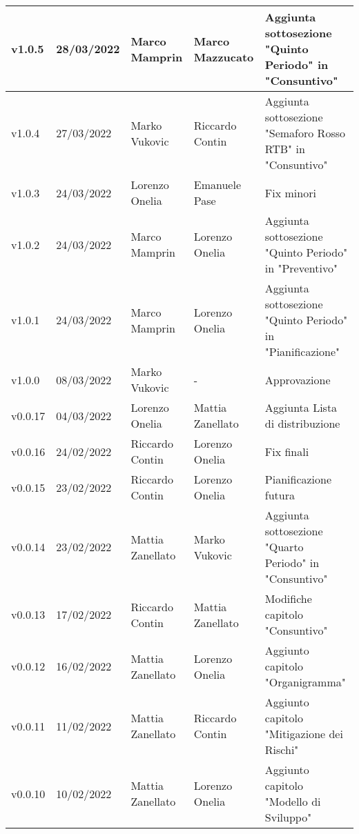 {\begin{longtable}{|C{1.8cm}|C{2.1cm}|C{2cm}|C{2.4cm}|L{4.4cm}|}
  v1.0.5        & 28/03/2022    & Marco Mamprin   &  Marco Mazzucato    & Aggiunta sottosezione "Quinto Periodo" in "Consuntivo" \\ \hline
  v1.0.4        & 27/03/2022    & Marko Vukovic   &  Riccardo Contin    & Aggiunta sottosezione "Semaforo Rosso RTB" in "Consuntivo" \\ \hline
  v1.0.3        & 24/03/2022    & Lorenzo Onelia  & Emanuele Pase    & Fix minori                  \\ \hline
  v1.0.2        & 24/03/2022    & Marco Mamprin   &  Lorenzo Onelia    & Aggiunta sottosezione "Quinto Periodo" in "Preventivo" \\ \hline
  v1.0.1        & 24/03/2022    & Marco Mamprin   &  Lorenzo Onelia    & Aggiunta sottosezione "Quinto Periodo" in "Pianificazione" \\ \hline
  v1.0.0        & 08/03/2022    & Marko Vukovic   &  -                 & Approvazione \\ \hline
  v0.0.17       & 04/03/2022    & Lorenzo Onelia  & Mattia Zanellato     & Aggiunta Lista di distribuzione                  \\ \hline
  v0.0.16       & 24/02/2022     & Riccardo Contin  & Lorenzo Onelia                                & Fix finali \\ \hline
  v0.0.15       & 23/02/2022    & Riccardo Contin   & Lorenzo Onelia                  & Pianificazione futura \\ \hline
  v0.0.14       & 23/02/2022    & Mattia Zanellato  & Marko Vukovic                   & Aggiunta sottosezione "Quarto Periodo" in "Consuntivo" \\ \hline
  v0.0.13       & 17/02/2022    & Riccardo Contin   & Mattia Zanellato                & Modifiche capitolo "Consuntivo" \\ \hline
  v0.0.12       & 16/02/2022    & Mattia Zanellato  & Lorenzo Onelia                  & Aggiunto capitolo "Organigramma" \\ \hline
  v0.0.11       & 11/02/2022    & Mattia Zanellato  & Riccardo Contin                 & Aggiunto capitolo "Mitigazione dei Rischi" \\ \hline
  v0.0.10       & 10/02/2022    & Mattia Zanellato  & Lorenzo Onelia                  & Aggiunto capitolo "Modello di Sviluppo" \\ \hline

\end{longtable}}
